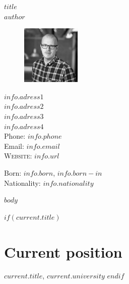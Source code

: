\documentclass[11pt]{article} %
\begin{document}

{\LARGE \em{$title$}}\\[0.5cm] %
{\LARGE $author$}\\[1cm] %

\begin{figure}
  \vspace{-16pt}
  \includegraphics[width=0.25\textwidth]{assets/profile_pic.png}
\end{figure}

$info.adress1$\\ %
$info.adress2$\\ %
$info.adress3$\\ %
$info.adress4$\\ %
[.2cm]
Phone: \texttt{$info.phone$}\\ %
Email: \href{mailto:#}{$info.email$}\\ %
\textsc{Website}: \href{http://$info.url$}{$info.url$}\\ %


\vspace{32pt}


Born: $info.born$, $info.born-in$\\ %
Nationality: $info.nationality$ %


$body$

\vspace{36pt}


$if(current.title)$
\section*{Current position}

\emph{$current.title$}, $current.university$ %
$endif$
\end{document}
